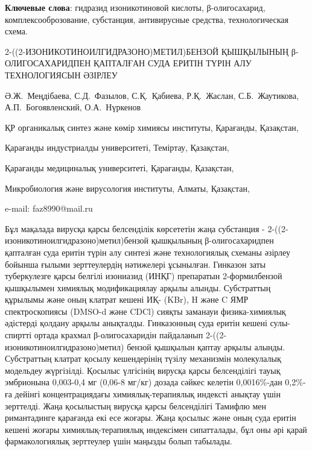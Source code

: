 {\bfseries Ключевые слова}: гидразид изоникотиновой кислоты,
β-олигосахарид, комплексооброзование, субстанция, антивирусные средства,
технологическая схема.

\begin{header}
2-((2-ИЗОНИКОТИНОИЛГИДРАЗОНО)МЕТИЛ)БЕНЗОЙ ҚЫШҚЫЛЫНЫҢ β-ОЛИГОСАХАРИДПЕН ҚАПТАЛҒАН СУДА ЕРИТІН ТҮРІН АЛУ ТЕХНОЛОГИЯСЫН ӘЗІРЛЕУ

Ә.Ж.~Меңдібаева,
С.Д.~Фазылов\envelope,
С.Қ.~Қабиева,
Р.Қ.~Жаслан,
С.Б.~Жаутикова,
А.П.~Богоявленский,
О.А.~Нүркенов
\end{header}

\begin{affil}
ҚР органикалық синтез және көмір химиясы институты, Қарағанды, Қазақстан,

Қарағанды индустриалды университеті, Теміртау, Қазақстан,

Қарағанды медициналық университеті, Қарағанды, Қазақстан,

Микробиология және вирусология институты, Алматы, Қазақстан,

e-mail: faz8990@mail.ru
\end{affil}

Бұл мақалада вирусқа қарсы белсенділік көрсететін жаңа субстанция -
2-((2-изоникотиноилгид\-разоно)метил)бензой қышқылының β-олигосахаридпен
қапталған суда еритін түрін алу синтезі және технологиялық схеманы
әзірлеу бойынша ғылыми зерттеулердің нәтижелері ұсынылған. Гинказон заты
туберкулезге қарсы белгілі изониазид (ИНҚГ) препаратын 2-формилбензой
қышқылымен химиялық модификациялау арқылы алынды. Субстраттың құрылымы
және оның клатрат кешені ИҚ- (KBr), H және
C ЯМР спектроскопиясы (DMSO-d және
CDCl) сияқты заманауи физика-химиялық әдістерді қолдану
арқылы анықталды. Гинказонның суда еритін кешені сулы-спиртті ортада
крахмал β-олигосахаридін пайдаланып 2-((2-изоникотиноилгидразоно)метил)
бензой қышқылын қаптау арқылы алынды. Субстраттың клатрат қосылу
кешендерінің түзілу механизмін молекулалық модельдеу жүргізілді. Қосылыс
үлгісінің вирусқа қарсы белсенділігі тауық эмбрионына 0,003-0,4 мг
(0,06-8 мг/кг) дозада сәйкес келетін 0,0016\%-дан 0,2\%-ға дейінгі
концентрациядағы химиялық-терапиялық индексті анықтау үшін зерттелді.
Жаңа қосылыстың вирусқа қарсы белсенділігі Тамифлю мен римантадинге
қарағанда екі есе жоғары. Жаңа қосылыс және оның суда еритін кешені
жоғары химиялық-терапиялық индексімен сипатталады, бұл оны әрі қарай
фармакологиялық зерттеулер үшін маңызды болып табылады.

